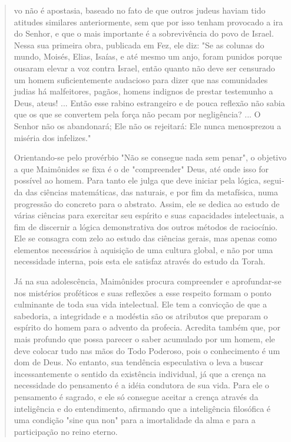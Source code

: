 \begin{quote}
vo não é apostasia, baseado no fato de que outros judeus haviam tido
atitudes similares anteriormente, sem que por isso tenham provocado a
ira do Senhor, e que o mais importante é a sobrevivência do povo de
Israel. Nessa sua primei­ra obra, publicada em Fez, ele diz: "Se as
colunas do mundo, Moisés, Elias, Isaías, e até mesmo um anjo, foram
punidos porque ousaram elevar a voz contra Is­rael, então quanto não
deve ser censurado um homem suficientemente auda­cioso para dizer que
nas comunidades judias há malfeitores, pagãos, homens indignos de
prestar testemunho a Deus, ateus! ... Então esse rabino estrangeiro e de
pouca reflexão não sabia que os que se convertem pela força não pecam
por negligência? ... O Senhor não os abandonará; Ele não os rejeitará:
Ele nun­ca menosprezou a miséria dos infelizes."

Orientando-se pelo provérbio "Não se consegue nada sem penar", o
objetivo a que Maimônides se fixa é o de "compreender" Deus, até onde
isso for possível ao homem. Para tanto ele julga que deve iniciar pela
lógica, segui­da das ciências matemáticas, das naturais, e por fim da
metafísica, numa pro­gressão do concreto para o abstrato. Assim, ele se
dedica ao estudo de várias ciências para exercitar seu espírito e suas
capacidades intelectuais, a fim de dis­cernir a lógica demonstrativa dos
outros métodos de raciocínio. Ele se consa­gra com zelo ao estudo das
ciências gerais, mas apenas como elementos neces­sários à aquisição de
uma cultura global, e não por uma necessidade interna, pois esta ele
satisfaz através do estudo da Torah.

Já na sua adolescência, Maimônides procura compreender e aprofun­dar-se
nos mistérios proféticos e suas reflexões a esse respeito formam o ponto
culminante de toda sua vida intelectual. Ele tem a convicção de que a
sabedo­ria, a integridade e a modéstia são os atributos que preparam o
espírito do ho­mem para o advento da profecia. Acredita também que, por
mais profundo que possa parecer o saber acumulado por um homem, ele deve
colocar tudo nas mãos do Todo Poderoso, pois o conhecimento é um dom de
Deus. No entan­to, sua tendência especulativa o leva a buscar
incessantemente o sentido da exis­tência individual, já que a crença na
necessidade do pensamento é a idéia con­dutora de sua vida. Para ele o
pensamento é sagrado, e ele só consegue aceitar a crença através da
inteligência e do entendimento, afirmando que a inteligên­cia filosófica
é uma condição "sine qua non" para a imortalidade da alma e pa­ra a
participação no reino eterno.
\end{quote}

